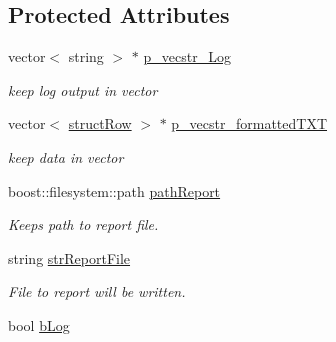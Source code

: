 \subsection*{Protected Attributes}
\begin{DoxyCompactItemize}
\item 
\hypertarget{classhandler__Report_a2a2e8a8bc459a3b007acb40ff556c2ae}{
vector$<$ string $>$ $\ast$ \hyperlink{classhandler__Report_a2a2e8a8bc459a3b007acb40ff556c2ae}{p\_\-vecstr\_\-Log}}
\label{classhandler__Report_a2a2e8a8bc459a3b007acb40ff556c2ae}

\begin{DoxyCompactList}\small\item\em keep log output in vector \item\end{DoxyCompactList}\item 
\hypertarget{classhandler__Report_aa36af55735b04c6bcc41a27fc913caff}{
vector$<$ \hyperlink{structstructRow}{structRow} $>$ $\ast$ \hyperlink{classhandler__Report_aa36af55735b04c6bcc41a27fc913caff}{p\_\-vecstr\_\-formattedTXT}}
\label{classhandler__Report_aa36af55735b04c6bcc41a27fc913caff}

\begin{DoxyCompactList}\small\item\em keep data in vector \item\end{DoxyCompactList}\item 
\hypertarget{classhandler__Report_a9837a9440d4966101ce058aac3d9f2c1}{
boost::filesystem::path \hyperlink{classhandler__Report_a9837a9440d4966101ce058aac3d9f2c1}{pathReport}}
\label{classhandler__Report_a9837a9440d4966101ce058aac3d9f2c1}

\begin{DoxyCompactList}\small\item\em Keeps path to report file. \item\end{DoxyCompactList}\item 
\hypertarget{classhandler__Report_a3886bbd9c74f29d506556d9e5df880b3}{
string \hyperlink{classhandler__Report_a3886bbd9c74f29d506556d9e5df880b3}{strReportFile}}
\label{classhandler__Report_a3886bbd9c74f29d506556d9e5df880b3}

\begin{DoxyCompactList}\small\item\em File to report will be written. \item\end{DoxyCompactList}\item 
\hypertarget{classhandler__Report_a31a53042cd0a7573c6085f873cc7c9c2}{
bool \hyperlink{classhandler__Report_a31a53042cd0a7573c6085f873cc7c9c2}{bLog}}
\label{classhandler__Report_a31a53042cd0a7573c6085f873cc7c9c2}


\end{DoxyCompactItemize}
